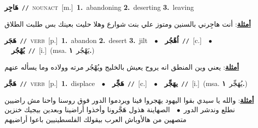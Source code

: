 \documentclass[10pt,a4paper,twoside]{article} %
\begin{document}
\begin{multicols}{2}
{\setlength\topsep{0pt}\textbf{\foreignlanguage{arabic}{هَاجِر}}\ {\color{gray}\texttt{//}\color{black}}\ \textsc{noun\textunderscore act}\ [m.]\ \textbf{1.}~abandoning  \textbf{2.}~deserting  \textbf{3.}~leaving\  \begin{flushright}\color{gray}\foreignlanguage{arabic}{\textbf{\underline{\foreignlanguage{arabic}{أمثلة}}}: أنت هاجِرني بالسنين ومتوز علي بنت شوارع وهلا حليت بعينك بس طلبت الطلاق}\end{flushright}\color{black}} \vspace{2mm}

{\setlength\topsep{0pt}\textbf{\foreignlanguage{arabic}{هَجَر}}\ {\color{gray}\texttt{//}\color{black}}\ \textsc{verb}\ [p.]\ \textbf{1.}~abandon  \textbf{2.}~desert  \textbf{3.}~jilt\ \ $\bullet$\ \ \setlength\topsep{0pt}\textbf{\foreignlanguage{arabic}{اُهْجُر}}\ {\color{gray}\texttt{//}\color{black}}\ [c.]\ \ $\bullet$\ \ \setlength\topsep{0pt}\textbf{\foreignlanguage{arabic}{يُهْجُر}}\ {\color{gray}\texttt{//}\color{black}}\ [i.]\ \color{gray}(msa. \foreignlanguage{arabic}{يَهْجُر}~\foreignlanguage{arabic}{\textbf{١.}})\color{black}\  \begin{flushright}\color{gray}\foreignlanguage{arabic}{\textbf{\underline{\foreignlanguage{arabic}{أمثلة}}}: يعني وين المنطق انه يروح يعيش بالخليج ويُهْجُر مرته وولاده وما يسأله عنهم}\end{flushright}\color{black}} \vspace{2mm}

{\setlength\topsep{0pt}\textbf{\foreignlanguage{arabic}{هَجَّر}}\ {\color{gray}\texttt{//}\color{black}}\ \textsc{verb}\ [p.]\ \textbf{1.}~displace\ \ $\bullet$\ \ \setlength\topsep{0pt}\textbf{\foreignlanguage{arabic}{هَجِّر}}\ {\color{gray}\texttt{//}\color{black}}\ [c.]\ \ $\bullet$\ \ \setlength\topsep{0pt}\textbf{\foreignlanguage{arabic}{يهَجِّر}}\ {\color{gray}\texttt{//}\color{black}}\ [i.]\ \color{gray}(msa. \foreignlanguage{arabic}{يُهَجِّر}~\foreignlanguage{arabic}{\textbf{١.}})\color{black}\  \begin{flushright}\color{gray}\foreignlanguage{arabic}{\textbf{\underline{\foreignlanguage{arabic}{أمثلة}}}: والله يا سيدي بقوا اليهود يهَجروا فينا ويردموا الدور فوق روسنا واحنا مش راضيين نطلع وندشر الدور\ $\bullet$\ \  الصهاينة هذول هَجَّرونا وأخذوا أراضينا وبعدين بيجيك خنزين متصهين من هالأوباش العرب بيقولك الفلسطينيين باعوا أراضيهم}\end{flushright}\color{black}} \vspace{2mm}


\end{multicols}
\end{document}
